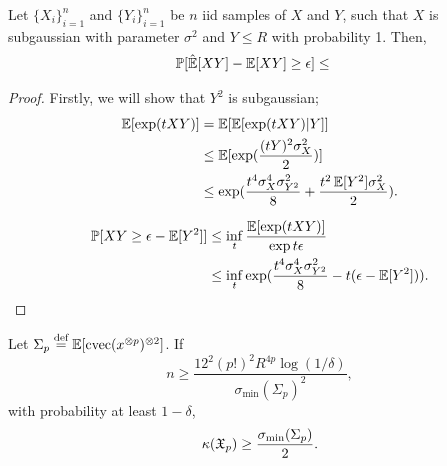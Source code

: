 \documentclass[tablecaption=bottom]{jmlr}
\newcommand\eqdef{\ensuremath{\stackrel{\textrm{def}}{=}}} %
\newcommand\sigmamin{\sigma_\textrm{min}}
\DeclareMathOperator{\cvec} {cvec}
\begin{document}
\begin{corollary}
  Let $\{X_i\}_{i=1}^n$ and $\{Y_i\}_{i=1}^n$ be $n$ iid
  samples of $X$ and $Y$, such that $X$ is subgaussian with parameter
  $\sigma^2$ and $Y \le R$ with probability 1. Then, 
  \begin{align}
    \mathbb{P}[ \hat{\operatorname{\mathbb{E}}}[ X Y ] - \operatorname{\mathbb{E}}[ X Y ] \ge \epsilon ] 
      &\le 
  \end{align}
\end{corollary}
\begin{proof}
  Firstly, we will show that $Y^2$ is subgaussian; 
  \begin{align}
    \operatorname{\mathbb{E}}[ \exp(t X Y) ] 
      &= \operatorname{\mathbb{E}}[ \operatorname{\mathbb{E}}[ \exp(t X Y) | Y ] ] \\
      &\le \operatorname{\mathbb{E}}[ \exp(\frac{(tY)^2 \sigma^2_X}{2}) ] \\
      &\le \exp(\frac{t^4 \sigma^4_X \sigma^2_{Y^2} }{8} + \frac{t^2 \operatorname{\mathbb{E}}[Y^2] \sigma^2_X }{2}).
  \end{align}


  \begin{align}
    \mathbb{P}[ XY \ge \epsilon - \operatorname{\mathbb{E}}[Y^2] ] 
      &\le \inf_t \frac{\operatorname{\mathbb{E}}[\exp(t XY)]}{\exp{t\epsilon}} \\
      &\le \inf_t \exp(\frac{t^4 \sigma^4_X \sigma^2_{Y^2} }{8} - t(\epsilon - \operatorname{\mathbb{E}}[Y^2])  ).
  \end{align}


\end{proof}

\begin{lemma}
\label{lem:lowRankLower}
Let $\Sigma_p \eqdef \E[\cvec(x\tp{p})\tp{2}]$.
If $$n \ge \frac{12^2 (p!)^2 R^{4p} \log(1/\delta)}{\sigmamin(\Sigma_p)^2},$$
with probability at least $1-\delta$,
$$\kappa(\opX_p) \ge \frac{\sigmamin(\Sigma_p)}{2}.$$
\end{lemma}
\end{document}
